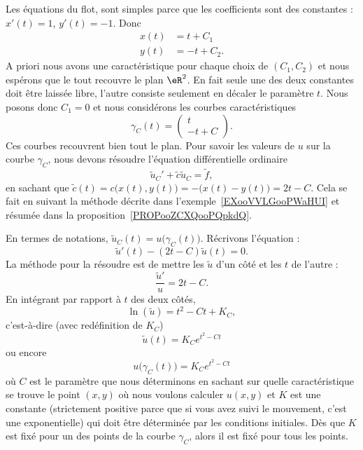 Les équations du flot, sont simples parce que les coefficients sont des constantes : \( x'(t)=1\), \( y'(t)=-1\). Donc
\begin{subequations}
    \begin{align}
        x(t)&=t+C_1\\
        y(t)&=-t+C_2.
    \end{align}
\end{subequations}
A priori nous avons une caractéristique pour chaque choix de \( (C_1,C_2)\) et nous espérons que le tout recouvre le plan \( \eR^2\). En fait seule une des deux constantes doit être laissée libre, l'autre consiste seulement en décaler le paramètre \( t\). Nous posons donc \( C_1=0\) et nous considérons les courbes caractéristiques
\begin{equation}
    \gamma_C(t)=\begin{pmatrix}
        t    \\
        -t+C
    \end{pmatrix}.
\end{equation}
Ces courbes recouvrent bien tout le plan. Pour savoir les valeurs de \( u\) sur la courbe \( \gamma_C\), nous devons résoudre l'équation différentielle ordinaire
\begin{equation}
    \tilde u_C'+\tilde c\tilde u_C=\tilde f,
\end{equation}
en sachant que \( \tilde c(t)=c\big( x(t),y(t) \big)=-\big( x(t)-y(t) \big)=2t-C\). Cela se fait en suivant la méthode décrite dans l'exemple~\ref{EXooVVLGooPWaHUI} et résumée dans la proposition~\ref{PROPooZCXQooPQpkdQ}.

En termes de notations, \( \tilde u_C(t)=u\big( \gamma_C(t) \big)\). Récrivons l'équation :
\begin{equation}
    \tilde u'(t)-(2t-C)\tilde u(t)=0.
\end{equation}
La méthode pour la résoudre est de mettre les \( \tilde u\) d'un côté et les \( t\) de l'autre :
\begin{equation}
    \frac{ \tilde u' }{ u }=2t-C.
\end{equation}
En intégrant par rapport à \( t\) des deux côtés,
\begin{equation}
    \ln(\tilde u)=t^2-Ct+K_C,
\end{equation}
c'est-à-dire (avec redéfinition de \( K_C\))
\begin{equation}
    \tilde u(t)=K_C e^{t^2-Ct}
\end{equation}
ou encore
\begin{equation}   \label{EQooSSTJooEQfRnP}
    u\big( \gamma_C(t) \big)=K_C e^{t^2-Ct}
\end{equation}
où \( C\) est le paramètre que nous déterminons en sachant sur quelle caractéristique se trouve le point \( (x,y)\) où nous voulons calculer \( u(x,y)\) et \( K\) est une constante (strictement positive parce que si vous avez suivi le mouvement, c'est une exponentielle) qui doit être déterminée par les conditions initiales. Dès que \( K\) est fixé pour un des points de la courbe \( \gamma_C\), alors il est fixé pour tous les points.

